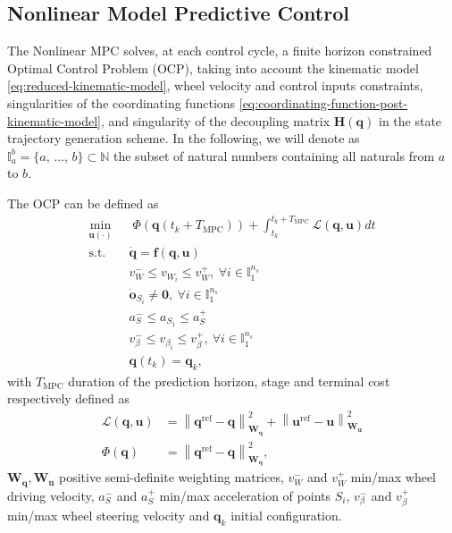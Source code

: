 \subsection{Nonlinear Model Predictive Control}
\label{sec:model-predictive-control}
The Nonlinear MPC solves, at each control cycle, a finite horizon constrained
Optimal Control Problem (OCP), taking into account the kinematic model
\eqref{eq:reduced-kinematic-model}, wheel velocity and control inputs
constraints, singularities of the coordinating functions
\eqref{eq:coordinating-function-post-kinematic-model}, and singularity of the
decoupling matrix $\bm{H}(\bm{q})$ in the state trajectory generation scheme.
In the following, we will denote as
$\mathbb{I}_a^b=\{a,\, \dots,\, b\}\subset\mathbb{N}$ the subset of natural
numbers containing all naturals from $a$ to $b$.

The OCP can be defined as 
\begin{equation*}
    \begin{aligned}
        \min_{\bm{u}(\cdot)} \;\;
            & \; \Phi(\bm{q}(t_k + T_{\mathrm{MPC}})) + \int_{t_k}^{t_k + T_{\mathrm{MPC}}} \mathcal{L}(\bm{q}, \bm{u}) dt \\
            \text{s.t. } & \dot{\bm{q}} = \bm{f}(\bm{q}, \bm{u}) \\
                         & v_W^- \le v_{W_i} \le v_W^+,\:  \forall i \in \mathbb{I}_1^{n_s} \\
                         & \dot{\bm{o}}_{S_i} \ne \bm{0},\: \forall i \in \mathbb{I}_1^{n_s} \\
                         & a_S^- \le a_{S_1} \le a_S^+ \\
                         & v_{\beta}^- \le v_{\beta_i} \le v_{\beta}^+,\: \forall i \in \mathbb{I}_1^{n_s} \\
                         & \bm{q}(t_k) = \bm{q}_k,
    \end{aligned}
\end{equation*}
with $T_{\mathrm{MPC}}$ duration of the prediction horizon, stage and terminal
cost respectively defined as
\begin{align*}
    \mathcal{L}(\bm{q}, \bm{u}) &= \left\|\bm{q}^{\mathrm{ref}} - \bm{q}\right\|_{\bm{W_q}}^2 + \left\|\bm{u}^{\mathrm{ref}} - \bm{u}\right\|_{\bm{W_u}}^2 \\
    \Phi(\bm{q}) &= \left\|\bm{q}^{\mathrm{ref}} - \bm{q}\right\|_{\bm{W_q}}^2,
\end{align*}
$\bm{W_q}, \bm{W_u}$ positive semi-definite weighting matrices, $v_W^-$ and
$v_W^+$ min/max wheel driving velocity, $a_S^-$ and $a_S^+$ min/max acceleration
of points $S_i$, $v_{\beta}^-$ and $v_{\beta}^+$  min/max wheel steering
velocity and $\bm{q}_k$ initial configuration.

